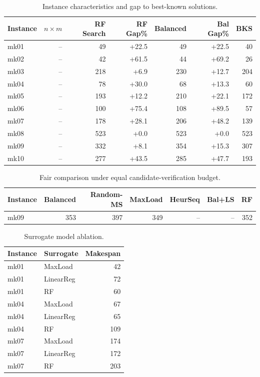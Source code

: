 \begin{table}[htbp]
\centering
\caption{Instance characteristics and gap to best-known solutions.}
\begin{tabular}{lrrrrrr}
\toprule
Instance & $n \times m$ & RF Search & RF Gap\% & Balanced & Bal Gap\% & BKS \\
\midrule
mk01 & -- & 49 & +22.5 & 49 & +22.5 & 40 \\
mk02 & -- & 42 & +61.5 & 44 & +69.2 & 26 \\
mk03 & -- & 218 & +6.9 & 230 & +12.7 & 204 \\
mk04 & -- & 78 & +30.0 & 68 & +13.3 & 60 \\
mk05 & -- & 193 & +12.2 & 210 & +22.1 & 172 \\
mk06 & -- & 100 & +75.4 & 108 & +89.5 & 57 \\
mk07 & -- & 178 & +28.1 & 206 & +48.2 & 139 \\
mk08 & -- & 523 & +0.0 & 523 & +0.0 & 523 \\
mk09 & -- & 332 & +8.1 & 354 & +15.3 & 307 \\
mk10 & -- & 277 & +43.5 & 285 & +47.7 & 193 \\
\bottomrule
\end{tabular}
\end{table}

\begin{table}[htbp]
\centering
\caption{Fair comparison under equal candidate-verification budget.}
\begin{tabular}{lrrrrrr}
\toprule
Instance & Balanced & Random-MS & MaxLoad & HeurSeq & Bal+LS & RF \\
\midrule
mk09 & 353 & 397 & 349 & -- & -- & 352 \\
\bottomrule
\end{tabular}
\end{table}

\begin{table}[htbp]
\centering
\caption{Surrogate model ablation.}
\begin{tabular}{llr}
\toprule
Instance & Surrogate & Makespan \\
\midrule
mk01 & MaxLoad & 42 \\
mk01 & LinearReg & 72 \\
mk01 & RF & 60 \\
mk04 & MaxLoad & 67 \\
mk04 & LinearReg & 65 \\
mk04 & RF & 109 \\
mk07 & MaxLoad & 174 \\
mk07 & LinearReg & 172 \\
mk07 & RF & 203 \\
\bottomrule
\end{tabular}
\end{table}
